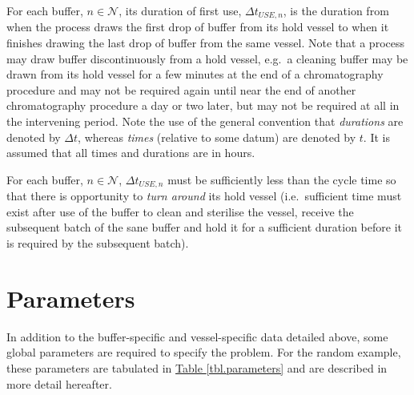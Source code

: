 For each buffer, $n \in \mathcal{N}$, its duration of first use,
$\Delta t_{\mathit{USE},n}$, is the duration from when the process draws the
first drop of buffer from its hold vessel to when it finishes drawing the last
drop of buffer from the same vessel.
Note that a process may draw buffer discontinuously from a hold vessel, e.g.\ a
cleaning buffer may be drawn from its hold vessel for a few minutes at the end
of a chromatography procedure and may not be required again until near the end
of another chromatography procedure a day or two later, but may not be required
at all in the intervening period.
Note the use of the general convention that \emph{durations} are denoted by
$\Delta t$, whereas \emph{times} (relative to some datum) are denoted by $t$.
It is assumed that all times and durations are in hours.

For each buffer, $n \in \mathcal{N}$, $\Delta t_{\mathit{USE},n}$ must be
sufficiently less than the cycle time so that there is opportunity to
\emph{turn around} its hold vessel (i.e.\ sufficient time must exist after use
of the buffer to clean and sterilise the vessel, receive the subsequent batch
of the sane buffer and hold it for a sufficient duration before it is
required by the subsequent batch).

\section{Parameters}\label{S.parameters}

In addition to the buffer-specific and vessel-specific data detailed above,
some global parameters are required to specify the problem.
For the random example, these parameters are tabulated in
\hyperref[tbl.parameters]{Table \ref*{tbl.parameters}} and are described in
more detail hereafter.

